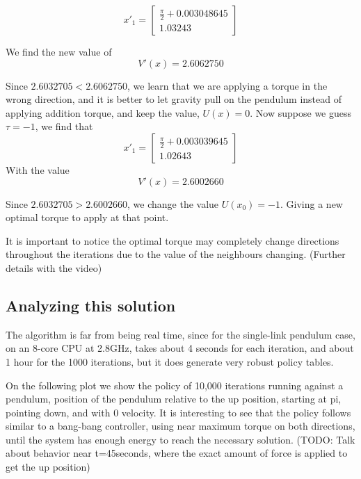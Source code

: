 \documentclass[12pt]{report}
\begin{document}
\begin{equation} 
{x'}_1 = 
\begin{bmatrix}
\frac{\pi}{2} + 0.003048645 \\
1.03243
\end{bmatrix}
\end{equation}

We find the new value of
\begin{equation} 
V'(x) = 2.6062750
\end{equation}

Since $2.6032705 < 2.6062750$, we learn that we are applying a torque in the wrong direction, and it is better to let gravity pull on the pendulum instead of applying addition torque, and keep the value, $U(x)={0}$. Now suppose we guess $\tau = -1$, we find that 
\begin{equation} 
{x'}_1 = 
\begin{bmatrix}
\frac{\pi}{2} + 0.003039645 \\
1.02643
\end{bmatrix}
\end{equation}
With the value
\begin{equation} 
V'(x) = 2.6002660
\end{equation}

Since $2.6032705 > 2.6002660$, we change the value $U(x_0)={-1}$. Giving a new optimal torque to apply at that point.

It is important to notice the optimal torque may completely change directions throughout the iterations due to the value of the neighbours changing. (Further details with the video)

\subsection{Analyzing this solution}
The algorithm is far from being real time, since for the single-link pendulum case, on an 8-core CPU at 2.8GHz, takes about 4 seconds for each iteration, and about 1 hour for the 1000 iterations, but it does generate very robust policy tables.

On the following plot we show the policy of 10,000 iterations running against a pendulum, position of the pendulum relative to the up position, starting at pi, pointing down, and with 0 velocity. It is interesting to see that the policy follows similar to a bang-bang controller, using near maximum torque on both directions, until the system has enough energy to reach the necessary solution. (TODO: Talk about behavior near t=45seconds, where the exact amount of force is applied to get the up position)
\end{document}
